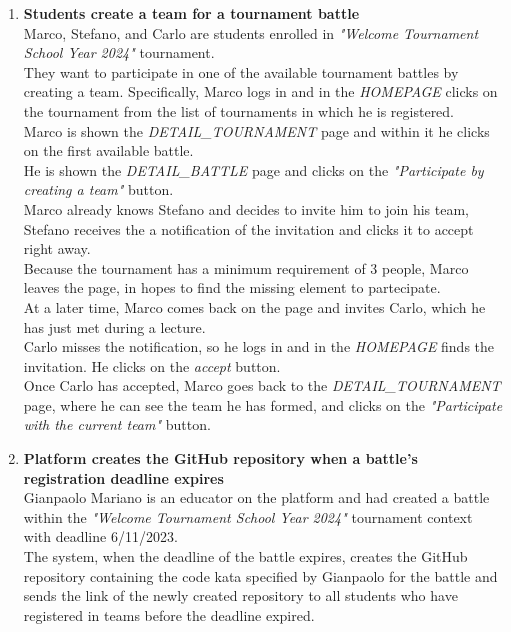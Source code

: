 \begin{enumerate}
	\item \textbf{Students create a team for a tournament battle}\\
	      Marco, Stefano, and Carlo are students enrolled in \emph{"Welcome Tournament School Year 2024"} tournament.\\
	      They want to participate in one of the available tournament battles by creating a team.
	      Specifically, Marco logs in and in the \emph{HOMEPAGE} clicks on the tournament from the list of tournaments in which he is registered.\\
	      Marco is shown the \emph{DETAIL\_TOURNAMENT} page and within it he clicks on the first available battle.\\
	      He is shown the \emph{DETAIL\_BATTLE} page and clicks on the \emph{"Participate by creating a team"} button.\\
	      Marco already knows Stefano and decides to invite him to join his team, Stefano receives the a notification of the invitation and
	      clicks it to accept right away.\\
	      Because the tournament has a minimum requirement of 3 people, Marco leaves the page, in hopes to find the missing element to partecipate.\\
	      At a later time, Marco comes back on the page and invites Carlo, which he has just met during a lecture.\\
	      Carlo misses the notification, so he logs in and in the \emph{HOMEPAGE} finds the invitation. He clicks on the
	      \emph{accept} button.\\
	      Once Carlo has accepted, Marco goes back to the \emph{DETAIL\_TOURNAMENT} page, where he can see the team he has formed,
	      and clicks on the \emph{"Participate with the current team"} button.

	\item \textbf{Platform creates the GitHub repository when a battle's registration deadline expires}\\
	      Gianpaolo Mariano is an educator on the platform and had created a battle within the \emph{"Welcome Tournament School Year 2024"} tournament context with deadline 6/11/2023.\\
	      The system, when the deadline of the battle expires, creates the GitHub repository containing the code kata specified by Gianpaolo for the battle and sends the link of the newly created repository to all students who have registered in teams before the deadline expired.



\end{enumerate}

